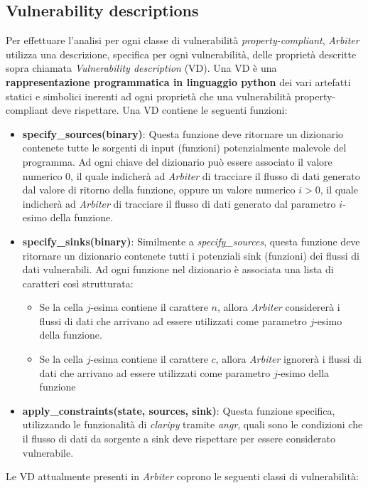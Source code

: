 \documentclass[../main.tex]{subfiles}
\begin{document}
\subsection{Vulnerability descriptions} 
Per effettuare l'analisi per ogni classe di vulnerabilità \textit{property-compliant}, \textit{Arbiter} utilizza una descrizione, specifica per ogni vulnerabilità, delle proprietà descritte sopra chiamata \textit{Vulnerability description} (VD).
Una VD è una \textbf{rappresentazione programmatica in linguaggio python} dei vari artefatti statici e simbolici inerenti ad ogni proprietà che una vulnerabilità property-compliant deve rispettare.
Una VD contiene le seguenti funzioni:
\begin{itemize}
    \item \textbf{specify\_sources(binary)}: Questa funzione deve ritornare un dizionario contenete tutte le sorgenti di input (funzioni) potenzialmente malevole  del programma. Ad ogni chiave del dizionario può
    essere associato il valore numerico $0$, il quale indicherà ad \textit{Arbiter} di tracciare il flusso di dati generato dal valore di ritorno della funzione, oppure un valore numerico $i > 0$, il quale indicherà ad \textit{Arbiter} di
    tracciare il flusso di dati generato dal parametro $i$-esimo della funzione.
    \item \textbf{specify\_sinks(binary)}: Similmente a \textit{specify\_sources}, questa funzione deve ritornare un dizionario contenete tutti i potenziali sink (funzioni) dei flussi di dati vulnerabili. Ad ogni funzione nel dizionario è associata una lista di caratteri così strutturata:
    \begin{itemize}
        \item Se la cella $j$-esima contiene il carattere $n$, allora \textit{Arbiter} considererà i flussi di dati che arrivano ad essere utilizzati come parametro $j$-esimo della funzione.
        \item Se la cella $j$-esima contiene il carattere $c$, allora \textit{Arbiter} ignorerà i flussi di dati che arrivano ad essere utilizzati come parametro $j$-esimo della funzione
    \end{itemize}
    \item \textbf{apply\_constraints(state, sources, sink)}: Questa funzione specifica, utilizzando le funzionalità di \textit{claripy} tramite \textit{angr}, quali sono le condizioni che il flusso di dati da sorgente a sink deve rispettare
    per essere considerato vulnerabile.
\end{itemize}
Le VD attualmente presenti in \textit{Arbiter} coprono le seguenti classi di vulnerabilità:
\end{document}
